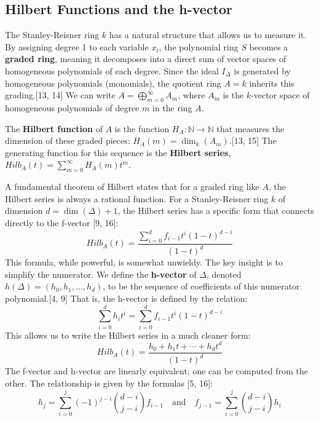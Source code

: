 \documentclass[11pt]{article}
\begin{document}
\subsection{Hilbert Functions and the h-vector}

The Stanley-Reisner ring $k$ has a natural structure that allows us to measure it. By assigning degree 1 to each variable $x_i$, the polynomial ring $S$ becomes a \textbf{graded ring}, meaning it decomposes into a direct sum of vector spaces of homogeneous polynomials of each degree. Since the ideal $I_\Delta$ is generated by homogeneous polynomials (monomials), the quotient ring $A = k$ inherits this grading.[13, 14] We can write $A = \bigoplus_{m=0}^\infty A_m$, where $A_m$ is the $k$-vector space of homogeneous polynomials of degree $m$ in the ring $A$.

The \textbf{Hilbert function} of $A$ is the function $H_A: \mathbb{N} \to \mathbb{N}$ that measures the dimension of these graded pieces: $H_A(m) = \dim_k(A_m)$.[13, 15] The generating function for this sequence is the \textbf{Hilbert series}, $Hilb_A(t) = \sum_{m=0}^\infty H_A(m) t^m$.

A fundamental theorem of Hilbert states that for a graded ring like $A$, the Hilbert series is always a rational function. For a Stanley-Reisner ring $k$ of dimension $d = \dim(\Delta)+1$, the Hilbert series has a specific form that connects directly to the f-vector [9, 16]:
\[
Hilb_A(t) = \frac{\sum_{i=0}^{d} f_{i-1} t^i (1-t)^{d-i}}{(1-t)^d}
\]
This formula, while powerful, is somewhat unwieldy. The key insight is to simplify the numerator. We define the \textbf{h-vector} of $\Delta$, denoted $h(\Delta) = (h_0, h_1, \ldots, h_d)$, to be the sequence of coefficients of this numerator polynomial.[4, 9] That is, the h-vector is defined by the relation:
\[
\sum_{i=0}^d h_i t^i = \sum_{i=0}^d f_{i-1} t^i (1-t)^{d-i}
\]
This allows us to write the Hilbert series in a much cleaner form:
\[
Hilb_A(t) = \frac{h_0 + h_1 t + \cdots + h_d t^d}{(1-t)^d}
\]
The f-vector and h-vector are linearly equivalent; one can be computed from the other. The relationship is given by the formulas [5, 16]:
\[
 h_j = \sum_{i=0}^j (-1)^{j-i} \binom{d-i}{j-i} f_{i-1} \quad \text{and} \quad f_{j-1} = \sum_{i=0}^j \binom{d-i}{j-i} h_i 
\]
\end{document}

